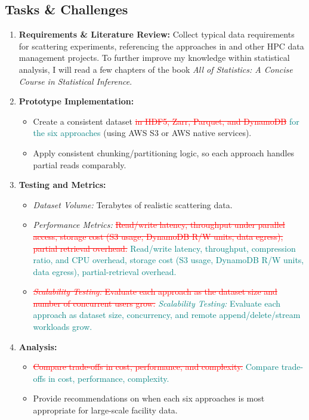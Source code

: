 \documentclass{article}
\begin{document}
\subsection{Tasks \& Challenges}
\begin{enumerate}
    \item \textbf{Requirements \& Literature Review:} 
    Collect typical data requirements for scattering experiments, referencing the approaches in \cite{wang2018synchrotron, meyer2014store, moriyama2019public, kek2021aws, godoy2021efficient} and other HPC data management projects. To further improve my knowledge within statistical analysis, I will read a few chapters of the book \textit{All of Statistics: A Concise Course in Statistical Inference}. 
    \item \textbf{Prototype Implementation:}
        \begin{itemize}
            \item Create a consistent dataset \textcolor{red}{\sout{in HDF5, Zarr, Parquet, and DynamoDB}} \textcolor{teal}{for the six approaches} (using AWS S3 or AWS native services).
            \item Apply consistent chunking/partitioning logic, so each approach handles partial reads comparably.
        \end{itemize}
    \item \textbf{Testing and Metrics:}
        \begin{itemize}
            \item \emph{Dataset Volume:} Terabytes of realistic scattering data.
            \item \emph{Performance Metrics:} \textcolor{red}{\sout{Read/write latency, throughput under parallel access, storage cost (S3 usage, DynamoDB R/W units, data egress), partial retrieval overhead.}} \textcolor{teal}{Read/write latency, throughput, compression ratio, and CPU overhead, storage cost (S3 usage, DynamoDB R/W units, data egress), partial-retrieval overhead.}
            \item \textcolor{red}{\sout{\emph{Scalability Testing:} Evaluate each approach as the dataset size and number of concurrent users grow.}} \textcolor{teal}{\emph{Scalability Testing:} Evaluate each approach as dataset size, concurrency, and remote append/delete/stream workloads grow.}
        \end{itemize}
    \item \textbf{Analysis:}
        \begin{itemize}
            \item \textcolor{red}{\sout{Compare trade-offs in cost, performance, and complexity.}} \textcolor{teal}{Compare trade-offs in cost, performance, complexity.}
            \item Provide recommendations on when each six approaches is most appropriate for large-scale facility data.
        \end{itemize}
\end{enumerate}
\end{document}
